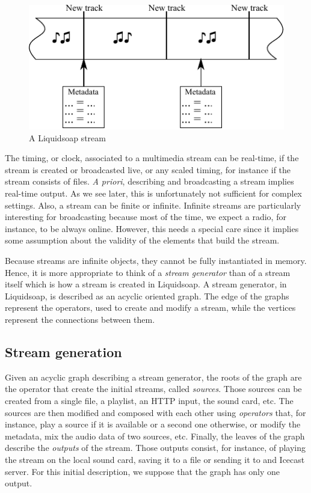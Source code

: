 \documentclass{llncs}
\newcommand{\liquidsoap}{Liquidsoap}
\begin{document}
\begin{figure}[htn]
 \begin{center}
\includegraphics{stream}
\end{center}
 \caption{A \liquidsoap{} stream}
\end{figure}

The timing, or clock, associated to a multimedia stream can be real-time, if the stream is created 
or broadcasted live, or any scaled timing, for instance if the stream consists of files. \textit{A priori},
describing and broadcasting a stream implies real-time output. As we see later, this is unfortunately 
not sufficient for complex settings.
Also, a stream can be finite or infinite. Infinite streams are particularly interesting for broadcasting
because most of the time, we expect a radio, for instance, to be always online. However, this needs 
a special care since it implies some assumption about the validity of the elements that build the stream.

Because streams are infinite objects, they cannot be fully instantiated in memory. Hence, it is 
more appropriate to think of a \textit{stream generator} than of a stream itself which is how
a stream is created in \liquidsoap{}. A stream generator, in \liquidsoap{}, is described as 
an acyclic oriented graph. The edge of the graphs represent the operators, used to create and modify
a stream, while the vertices represent the connections between them.

\subsection*{Stream generation}

Given an acyclic graph describing a stream generator, the roots of the graph are the operator that create 
the initial streams, called \textit{sources}. Those sources can be created from a single file, a playlist, an HTTP input,
the sound card, etc. The sources are then modified and composed with each other using 
\textit{operators} that, for instance, play a source if it is available or a second one otherwise, or modify
the metadata, mix the audio data of two sources, etc.
Finally, the leaves of the graph describe the \textit{outputs} of the stream. Those outputs consist, for instance,
of playing the stream on the local sound card, saving it to a file or sending it to and Icecast server. 
For this initial description, we suppose that the graph has only one output.
\end{document}
